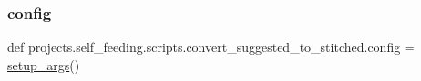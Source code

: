 \subsubsection{\texorpdfstring{config}{config}}
{\footnotesize\ttfamily def projects.\+self\+\_\+feeding.\+scripts.\+convert\+\_\+suggested\+\_\+to\+\_\+stitched.\+config = \hyperlink{namespaceprojects_1_1self__feeding_1_1scripts_1_1convert__suggested__to__stitched_abb3be1e61354f80ddbc5d87ffe42e518}{setup\+\_\+args}()}

